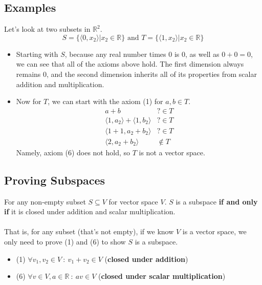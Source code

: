 \documentclass[10pt]{article}
\begin{document}
\subsection*{Examples}
Let's look at two subsets in $\mathbb{R}^2$.
\[S = \{\langle 0, x_2 \rangle | x_2 \in \mathbb{R}\} \text{ and } T = \{ \langle 1, x_2 \rangle | x_2 \in \mathbb{R}\}\]
\begin{itemize}
	\item Starting with $S$, because any real number times $0$ is $0$, as well as $0 + 0 = 0$, we can see that all of the axioms above hold.  The first dimension always remains 0, and the second dimension inherits all of its properties from scalar addition and multiplication.
	\item Now for $T$, we can start with the axiom (1) for $a, b \in T$.
	\begin{align*}
        a + b &?\in T\\
        \langle 1, a_2 \rangle + \langle 1, b_2 \rangle &?\in T\\
        \langle 1 + 1, a_2 + b_2 \rangle &?\in T\\
        \langle 2, a_2 + b_2 \rangle &\notin T
    \end{align*}
    Namely, axiom (6) does not hold, so $T$ is not a vector space.
\end{itemize}

\subsection*{Proving Subspaces}
For any non-empty subset $S \subseteq V$ for vector space $V$.  $S$ is a subspace \textbf{if and only if} it is closed under addition and scalar multiplication.\\\\
That is, for any subset (that's not empty), if we know $V$ is a vector space, we only need to prove (1) and (6) to show $S$ is a subspace.
\begin{itemize}
	\item (1) $\forall v_1, v_2 \in V \::\: v_1 + v_2 \in V$ (\textbf{closed under addition})
	\item (6) $\forall v \in V, a \in \mathbb{R} \::\: av \in V$ (\textbf{closed under scalar multiplication})
\end{itemize}
\end{document}
